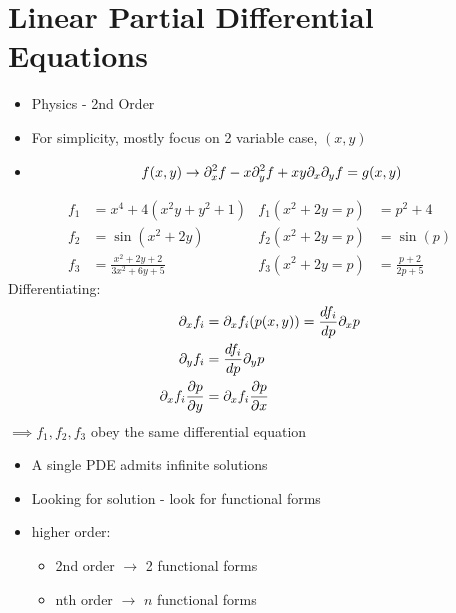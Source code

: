 \documentclass[Maths.tex]{subfiles}
\begin{document}
\section{Linear Partial Differential Equations}
\begin{itemize}
	\item Physics - 2nd Order
	\item For simplicity, mostly focus on 2 variable case, $(x,y)$
	\item
	\begin{equation*}
		f(x,y) \to \partial_x^2f - x\partial_y^2f + xy\partial_x\partial_yf = g(x,y)
	\end{equation*}
\end{itemize}

\begin{example}
\begin{align*}
	f_1 &= x^4 + 4(x^2y + y^2 + 1) & f_1(x^2+2y = p) &= p^2 + 4 \\
	f_2 &= \sin(x^2 + 2y) & f_2(x^2+2y = p) &= \sin(p) \\
	f_3 &= \frac{x^2 + 2y + 2}{3x^2 + 6y + 5} & f_3(x^2+2y=p) &= \frac{p+2}{2p+5}
\end{align*}
Differentiating:
\begin{align*}
	\partial_xf_i &= \partial_xf_i(p(x,y)) = \frac{df_i}{dp}\partial_xp \\
	\partial_yf_i &= \frac{df_i}{dp}\partial_y p \\
	\partial_xf_i\frac{\partial p}{\partial y} &= \partial_xf_i \frac{\partial p}{\partial x}
\end{align*}
$\implies f_1,f_2,f_3$ obey the same differential equation
\end{example}

\begin{itemize}
	\item A single PDE admits infinite solutions
	\item Looking for solution - look for functional forms
	\item higher order:
	\begin{itemize}
		\item 2nd order $\to$ 2 functional forms
		\item nth order $\to$ $n$ functional forms
	\end{itemize}
\end{itemize}
\end{document}
